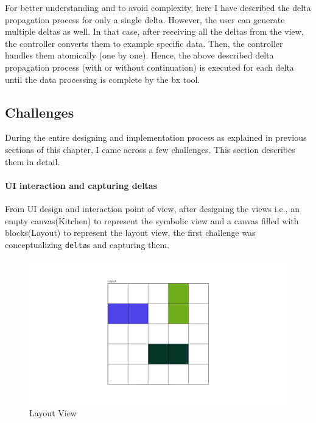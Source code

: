 For better understanding and to avoid complexity, here I have described the delta propagation process for only a single delta. However, the user can generate multiple deltas as well. In that case, after receiving all the deltas from the view, the controller converts them to example specific data. Then, the controller handles them atomically (one by one). Hence, the above described delta propagation process (with or without continuation) is executed for each delta until the data processing is complete by the bx tool.

\subsection{Challenges}\label{subsec:designchallenges}
During the entire designing and implementation process as explained in previous sections of this chapter, I came across a few challenges. This section describes them in detail. 

\paragraph{UI interaction and capturing deltas}
From UI design and interaction point of view, after designing the views i.e., an empty canvas(Kitchen) to represent the symbolic view and a canvas filled with blocks(Layout) to represent the layout view, the first challenge was conceptualizing \texttt{delta}s and capturing them. 

\begin{figure}[h]
	\includegraphics[width=1\textwidth]{figures/layout}
	\caption{Layout View}
	\label{fig:Layout}
\end{figure}


